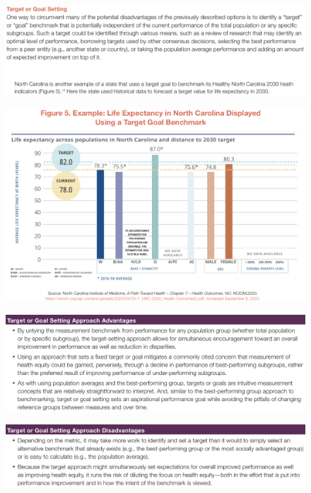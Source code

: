 \documentclass[14pt]{extarticle}
\begin{document}
\begin{figure}[H]
    \centering
    \includegraphics[width=1\textwidth]{fig18.png}
\end{figure}
\begin{figure}[H]
    \centering
    \includegraphics[width=1\textwidth]{fig19.png}
\end{figure}
\begin{figure}[H]
    \centering
    \includegraphics[width=1\textwidth]{fig20.png}
\end{figure}
\begin{figure}[H]
    \centering
    \includegraphics[width=1\textwidth]{fig21.png}
\end{figure}
\end{document}

